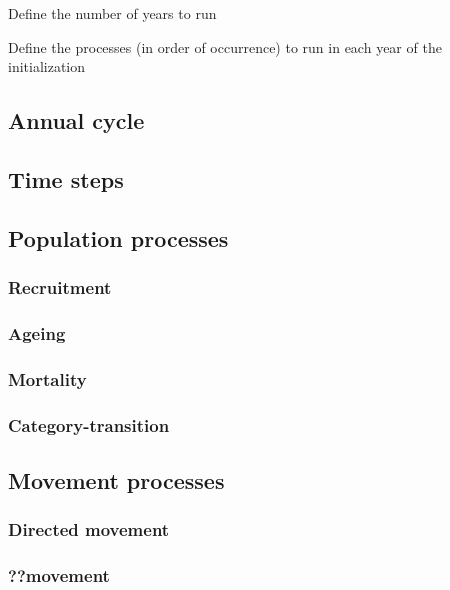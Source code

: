  {Define the number of years to run}

 {Define the processes (in order of occurrence) to run in each year of the initialization}


\subsection{Annual cycle}

\subsection{Time steps}

\subsection{Population processes}

\subsubsection{Recruitment}
\subsubsection{Ageing}
\subsubsection{Mortality}
\subsubsection{Category-transition}

\subsection{Movement processes}
\subsubsection{Directed movement}
\subsubsection{??movement}

